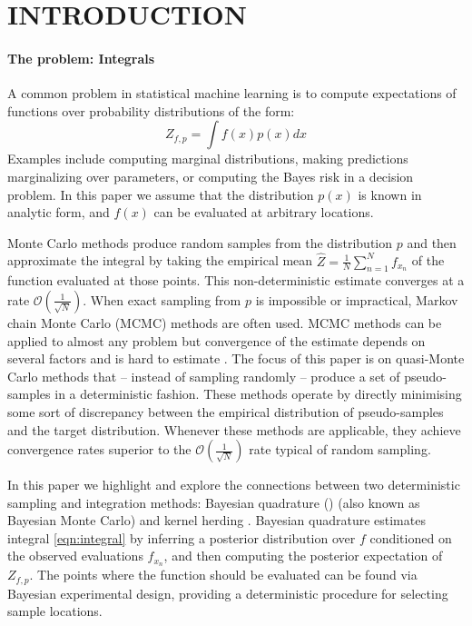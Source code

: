 \documentclass[]{article}
\begin{document}
 
\section{INTRODUCTION}
\paragraph{The problem: Integrals} A common problem in statistical machine learning is to compute expectations of functions over probability distributions of the form:
\begin{equation}
	Z_{f,p} = \int f(x) p(x) dx \label{eqn:integral}
\end{equation}
Examples include computing marginal distributions, making predictions marginalizing over parameters, or computing the Bayes risk in a decision problem. In this paper we assume that the distribution $p(x)$ is known in analytic form, and $f(x)$ can be evaluated at arbitrary locations.

Monte Carlo methods produce random samples from the distribution $p$ and then approximate the integral by taking the empirical mean $\hat{Z} = \frac{1}{N}\sum_{n=1}^{N}f_{x_n}$ of the function evaluated at those points. This non-deterministic estimate converges at a rate $\mathcal{O}(\frac{1}{\sqrt{N}})$. When exact sampling from $p$ is impossible or impractical, Markov chain Monte Carlo (MCMC) methods are often used. MCMC methods can be applied to almost any problem but convergence of the estimate depends on several factors and is hard to estimate \citep{CowlesCarlin96}. The focus of this paper is on quasi-Monte Carlo methods that -- instead of sampling randomly -- produce a set of pseudo-samples in a deterministic fashion. These methods operate by directly minimising some sort of discrepancy between the empirical distribution of pseudo-samples and the target distribution. Whenever these methods are applicable, they achieve convergence rates superior to the $\mathcal{O}(\frac{1}{\sqrt{N}})$ rate typical of random sampling.

In this paper we highlight and explore the connections between two deterministic sampling and integration methods: Bayesian quadrature (\bq{}) \citep{BZHermiteQuadrature,BZMonteCarlo} (also known as Bayesian Monte Carlo) and kernel herding \citep{chen2010super}. Bayesian quadrature estimates integral \eqref{eqn:integral} by inferring a posterior distribution over $f$ conditioned on the observed evaluations $f_{x_n}$, and then computing the posterior expectation of $Z_{f,p}$. The points where the function should be evaluated can be found via Bayesian experimental design, providing a deterministic procedure for selecting sample locations.
\end{document}
